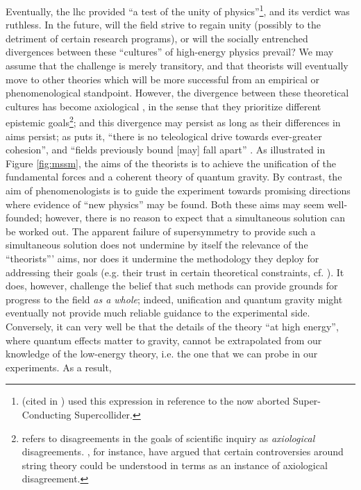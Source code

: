 \documentclass[smallextended]{svjour3}
\begin{document}
Eventually, the \gls{lhc} provided ``a test of the unity of physics''\footnote{ \citet[p.~29]{Wilson1986} (cited in \citealt[p.~292]{Cat1998}) used this expression in reference to the now aborted Super-Conducting Supercollider.}, and its verdict was ruthless. In the future, will the field strive to regain unity (possibly to the detriment of certain research programs), or will the socially entrenched divergences between these ``cultures'' of high-energy physics prevail?  We may assume that the challenge is merely transitory, and that theorists will eventually move to other theories which will be more successful from an empirical or phenomenological standpoint. However, the divergence between these theoretical cultures has become axiological \citep{Camilleri2015,Laudan1984}, in the sense that they prioritize different epistemic goals\footnote{ \citet{Laudan1984} refers to disagreements in the goals of scientific inquiry as \textit{axiological} disagreements. \citealt{Camilleri2015}, for instance, have argued that certain controversies around string theory could be understood in terms as an instance of axiological disagreement.}; and this divergence may persist as long as their differences in aims persist; as \citeauthor{galison1997image} puts it, ``there is no teleological drive towards ever-greater cohesion'', and ``fields previously bound [may] fall apart'' \citep[p.~805]{galison1997image}. As illustrated in Figure \ref{fig:mssm}, the aims of the theorists is to achieve the unification of the fundamental forces and a coherent theory of quantum gravity. By contrast, the aim of phenomenologists is to guide the experiment towards promising directions where evidence of ``new physics'' may be found. Both these aims may seem well-founded; however, there is no reason to expect that a simultaneous solution can be worked out. The apparent failure of supersymmetry to provide such a simultaneous solution does not undermine by itself the relevance of the ``theorists''' aims, nor does it undermine the methodology they deploy for addressing their goals (e.g. their trust in certain theoretical constraints, cf. \citealt{Galison1995}). It does, however, challenge the belief that such methods can provide grounds for progress to the field \textit{as a whole}; indeed, unification and quantum gravity might eventually not provide much reliable guidance to the experimental side. Conversely, it can very well be that the details of the theory ``at high energy'', where quantum effects matter to gravity, cannot be extrapolated from our knowledge of the low-energy theory, i.e. the one that we can probe in our experiments. As a result, 
\end{document}
